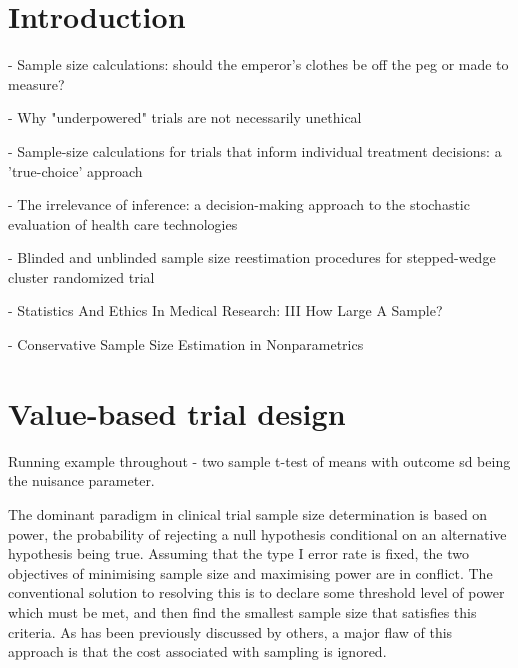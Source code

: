 \documentclass[sagev]{sagej}
\begin{document}

\maketitle

\section{Introduction}\label{sec:intro}

\cite{Norman2012} - Sample size calculations: should the emperor's clothes be off the peg or made to measure?

\cite{Edwards1997} - Why "underpowered" trials are not necessarily unethical

\cite{Girling2007} - Sample-size calculations for trials that inform individual treatment decisions: a 'true-choice' approach

\cite{Claxton1999} - The irrelevance of inference: a decision-making approach to the stochastic evaluation of health care technologies

\cite{Grayling2018} - Blinded and unblinded sample size reestimation procedures for stepped-wedge cluster randomized trial

\cite{Altman1980} - Statistics And Ethics In Medical Research: III How Large A Sample?

\cite{DeMartini2010} - Conservative Sample Size Estimation in Nonparametrics



\section{Value-based trial design}

Running example throughout - two sample t-test of means with outcome sd being the nuisance parameter.

The dominant paradigm in clinical trial sample size determination is based on power, the probability of rejecting a null hypothesis conditional on an alternative hypothesis being true. Assuming that the type I error rate is fixed, the two objectives of minimising sample size and maximising power are in conflict. The conventional solution to resolving this is to declare some threshold level of power which must be met, and then find the smallest sample size that satisfies this criteria. As has been previously discussed by others, a major flaw of this approach is that the cost associated with sampling is ignored.
\end{document}
